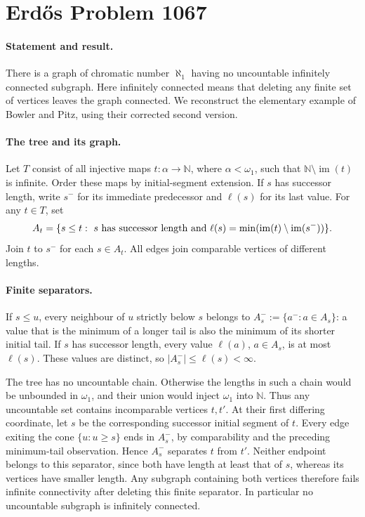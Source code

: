 \section*{Erd\H{o}s Problem 1067}

\paragraph{Statement and result.}
There is a graph of chromatic number \(\aleph_1\) having no uncountable infinitely connected subgraph. Here infinitely connected means that deleting any finite set of vertices leaves the graph connected. We reconstruct the elementary example of Bowler and Pitz, using their corrected second version.

\paragraph{The tree and its graph.}
Let \(T\) consist of all injective maps \(t:\alpha\to\mathbb N\), where \(\alpha<\omega_1\), such that \(\mathbb N\setminus\operatorname{im}(t)\) is infinite. Order these maps by initial-segment extension. If \(s\) has successor length, write \(s^-\) for its immediate predecessor and \(\ell(s)\) for its last value. For any \(t\in T\), set
\[
 A_t=\{s\leq t:\ s\hbox{ has successor length and }
 \ell(s)=\min(\operatorname{im}(t)\setminus\operatorname{im}(s^-))\}.
\]
Join \(t\) to \(s^-\) for each \(s\in A_t\). All edges join comparable vertices of different lengths.

\paragraph{Finite separators.}
If \(s\leq u\), every neighbour of \(u\) strictly below \(s\) belongs to
\(A_s^-:=\{a^-:a\in A_s\}\): a value that is the minimum of a longer tail is also the minimum of its shorter initial tail. If \(s\) has successor length, every value \(\ell(a)\), \(a\in A_s\), is at most \(\ell(s)\). These values are distinct, so \(|A_s^-|\leq\ell(s)<\infty\).

The tree has no uncountable chain. Otherwise the lengths in such a chain would be unbounded in \(\omega_1\), and their union would inject \(\omega_1\) into \(\mathbb N\). Thus any uncountable set contains incomparable vertices \(t,t'\). At their first differing coordinate, let \(s\) be the corresponding successor initial segment of \(t\). Every edge exiting the cone \(\{u:u\geq s\}\) ends in \(A_s^-\), by comparability and the preceding minimum-tail observation. Hence \(A_s^-\) separates \(t\) from \(t'\). Neither endpoint belongs to this separator, since both have length at least that of \(s\), whereas its vertices have smaller length. Any subgraph containing both vertices therefore fails infinite connectivity after deleting this finite separator. In particular no uncountable subgraph is infinitely connected.

